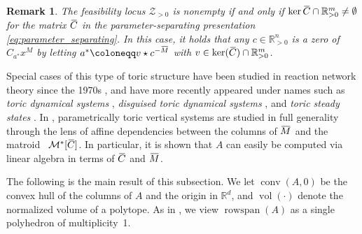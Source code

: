 \documentclass[11pt,reqno,a4paper]{amsart}
\numberwithin{equation}{section}
\theoremstyle{theoremstyle}
\theoremstyle{examplestyle}
\newtheorem{remark}[theorem]{Remark}
\newcommand{\RR}{\mathbb{R}}
\DeclareMathOperator{\rowspan}{rowspan}
\DeclareMathOperator{\conv}{conv}
\DeclareMathOperator{\vol}{vol}
\newcommand{\overbar}[1]{\mkern 2.5mu\overline{\mkern-2.5mu#1\mkern-1.5mu}\mkern 1.5mu}
\begin{document}
\begin{remark}
\label{rmk:nonemptiness_of_Z}
The feasibility locus $\mathcal{Z}_{>0}$ is nonempty if and only if $\ker \overbar{C} \cap \RR^m_{>0}\neq \emptyset$ for the matrix $\overbar{C}$ in the parameter-separating presentation \eqref{eq:parameter_separating}. In this case, it holds that any $c\in\RR^n_{>0}$ is a zero of $C_{a^*}x^M$ by letting $a^*\coloneqq v \star c^{-\overbar{M}}$ with $v \in \ker(\overbar{C}) \cap \RR^m_{>0}$.
\end{remark}

Special cases of this type of toric structure have been studied in reaction network theory since the 1970s \cite{HornJackson1972}, and have more recently appeared under names such as \emph{toric dynamical systems} \cite{CraciunDickensteinShiuSturmfels}, \emph{disguised toric dynamical systems} \cite{BrustengaCraciunSorea}, and \emph{toric steady states} \cite{PerezMillanDickensteinShiuConradi}. 
In \cite{FeliuHenriksson2024}, parametrically toric vertical systems are studied in full generality through the lens of affine dependencies between the columns of $\overbar{M}$ and the matroid ~$\mathcal{M}^*[\overbar{C}]$. 
In particular, it is shown that $A$ can easily be computed via linear algebra in terms of $\overbar{C}$ and $\overbar{M}$.

The following is the main result of this subsection. We let $\conv(A,0)$ be the convex hull of the columns of $A$ and the origin in $\RR^d$, and $\vol(\cdot)$ denote the normalized volume of a polytope. As in , we view $\rowspan(A)$ as a single polyhedron of multiplicity~1. 
 
\end{document}
